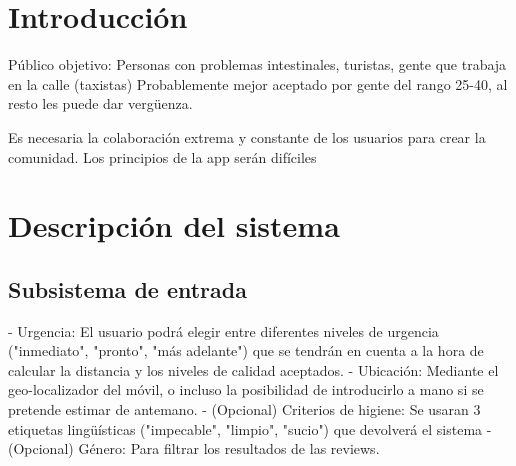 \documentclass[13pt,a4paper]{article}
\begin{document}
    
    
    \tableofcontents
    \thispagestyle{empty}				%

    \newpage





\section{Introducción}

Público objetivo: Personas con problemas intestinales, turistas, gente que trabaja en la calle (taxistas)
Probablemente mejor aceptado por gente del rango 25-40, al resto les puede dar vergüenza.

Es necesaria la colaboración extrema y constante de los usuarios para crear la comunidad. Los principios de la app serán difíciles


\section{Descripción del sistema}


\subsection{Subsistema de entrada}

- Urgencia: El usuario podrá elegir entre diferentes niveles de urgencia ("inmediato", "pronto", "más adelante") que se tendrán en cuenta a la hora de calcular la distancia y los niveles de calidad aceptados.
- Ubicación: Mediante el geo-localizador del móvil, o incluso la posibilidad de introducirlo a mano si se pretende estimar de antemano.
- (Opcional) Criterios de higiene: Se usaran 3 etiquetas lingüísticas ("impecable", "limpio", "sucio") que devolverá el sistema
- (Opcional) Género: Para filtrar los resultados de las reviews.
\end{document}
